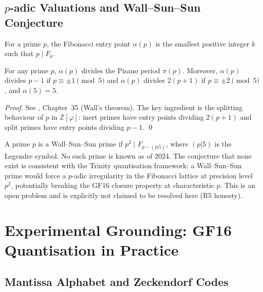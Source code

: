 \subsection{\(p\)-adic Valuations and Wall--Sun--Sun Conjecture}
\label{subsec:ch7-wall-sun-sun}

\begin{definition}\label{def:entry-point}
For a prime \(p\), the Fibonacci entry point \(\alpha(p)\) is the
smallest positive integer \(k\) such that \(p \mid F_k\).
\end{definition}

\begin{proposition}\label{prop:entry-point}
For any prime \(p\), \(\alpha(p)\) divides the Pisano period \(\pi(p)\).
Moreover, \(\alpha(p)\) divides \(p-1\) if \(p \equiv \pm 1 \pmod{5}\)
and \(\alpha(p)\) divides \(2(p+1)\) if \(p \equiv \pm 2 \pmod{5}\),
and \(\alpha(5) = 5\).
\end{proposition}

\begin{proof}
See \cite{koshy_fib_lucas}, Chapter~35 (Wall's theorem).  The key ingredient
is the splitting behaviour of \(p\) in \(\mathbb{Z}[\varphi]\): inert primes
have entry points dividing \(2(p+1)\) and split primes have entry points
dividing \(p-1\).
\qed
\end{proof}

\begin{remark}\label{rem:wss}
A prime \(p\) is a Wall--Sun--Sun prime if \(p^2 \mid F_{p - (p|5)}\),
where \((p|5)\) is the Legendre symbol.  No such prime is known as of 2024.
The conjecture that none exist is consistent with the Trinity quantisation
framework: a Wall--Sun--Sun prime would force a \(p\)-adic irregularity in
the Fibonacci lattice at precision level \(p^2\), potentially breaking the
GF16 closure property at characteristic \(p\).  This is an open problem
and is explicitly not claimed to be resolved here (R5 honesty).
\end{remark}

\section{Experimental Grounding: GF16 Quantisation in Practice}
\label{sec:ch7-experiments}

\subsection{Mantissa Alphabet and Zeckendorf Codes}
\label{subsec:ch7-mantissa}

